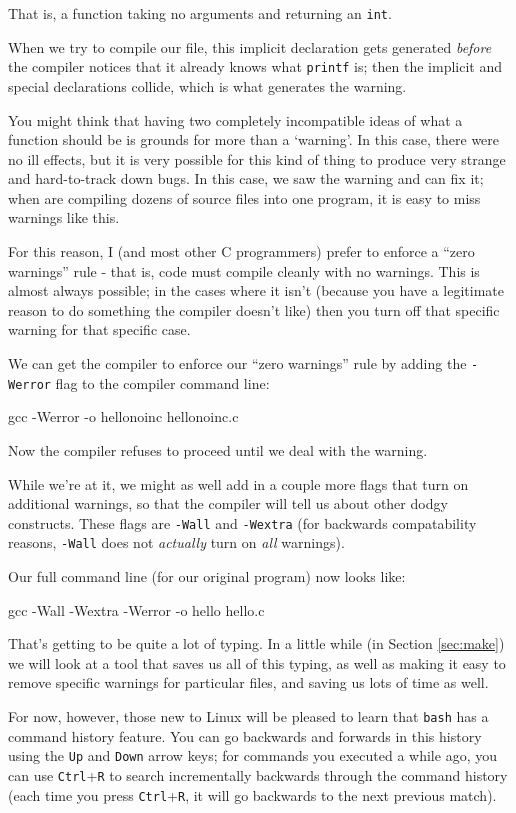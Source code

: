 \documentclass[a4paper,10pt]{article}
\newcommand{\kw}[1]{\texttt{#1}}
\newcommand{\key}[1]{\texttt{#1}}
\begin{document}
\noindent
That is, a function taking no arguments and returning an \kw{int}.

When we try to compile our file, this implicit declaration gets
generated \emph{before} the compiler notices that it already knows
what \kw{printf} is; then the implicit and special declarations
collide, which is what generates the warning.

You might think that having two completely incompatible ideas of what
a function should be is grounds for more than a `warning'. In this
case, there were no ill effects, but it is very possible for this kind
of thing to produce very strange and hard-to-track down bugs. In this
case, we saw the warning and can fix it; when are compiling dozens of
source files into one program, it is easy to miss warnings like this.

For this reason, I (and most other C programmers) prefer to enforce a
``zero warnings'' rule - that is, code must compile cleanly with no
warnings. This is almost always possible; in the cases where it isn't
(because you have a legitimate reason to do something the compiler
doesn't like) then you turn off that specific warning for that specific
case.

We can get the compiler to enforce our ``zero warnings'' rule by
adding the \kw{-Werror} flag to the compiler command line:

gcc -Werror -o hellonoinc hellonoinc.c
\END

\noindent
Now the compiler refuses to proceed until we deal with the warning.

While we're at it, we might as well add in a couple more flags that
turn on additional warnings, so that the compiler will tell us about
other dodgy constructs. These flags are \kw{-Wall} and \kw{-Wextra}
(for backwards compatability reasons, \kw{-Wall} does not
\emph{actually} turn on \emph{all} warnings).

Our full command line (for our original program) now looks like:

gcc -Wall -Wextra -Werror -o hello hello.c
\END

\noindent
That's getting to be quite a lot of typing. In a little while (in
Section \ref{sec:make}) we will look at a tool that saves us all of
this typing, as well as making it easy to remove specific warnings for
particular files, and saving us lots of time as well.

For now, however, those new to Linux will be pleased to learn that
\kw{bash} has a command history feature. You can go backwards and
forwards in this history using the \key{Up} and \key{Down} arrow keys;
for commands you executed a while ago, you can use \key{Ctrl}+\key{R}
to search incrementally backwards through the command history (each
time you press \key{Ctrl}+\key{R}, it will go backwards to the next
previous match).
\end{document}
